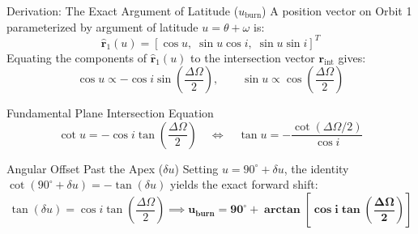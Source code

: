 \documentclass[aspectratio=169,10pt]{beamer}
\begin{document}
\begin{frame}{Derivation: The Exact Argument of Latitude (\texorpdfstring{$u_{\text{burn}}$}{u\_burn})}
    \footnotesize
    A position vector on Orbit 1 parameterized by argument of latitude $u = \theta + \omega$ is:
    $$\hat{\mathbf{r}}_1(u) = \left[ \cos u, \; \sin u \cos i, \; \sin u \sin i \right]^T$$
    Equating the components of $\hat{\mathbf{r}}_1(u)$ to the intersection vector $\mathbf{r}_{\text{int}}$ gives:
    $$\cos u \propto -\cos i \sin\left(\frac{\Delta\Omega}{2}\right), \qquad \sin u \propto \cos\left(\frac{\Delta\Omega}{2}\right)$$
    
    \vspace{-0.1cm}
    \begin{block}{Fundamental Plane Intersection Equation}
        \footnotesize
        $$\cot u = -\cos i \tan\left(\frac{\Delta\Omega}{2}\right) \quad \Longleftrightarrow \quad \tan u = -\frac{\cot(\Delta\Omega / 2)}{\cos i}$$
    \end{block}
    
    \vspace{-0.1cm}
    \begin{exampleblock}{Angular Offset Past the Apex ($\delta u$)}
        \footnotesize
        Setting $u = 90^\circ + \delta u$, the identity $\cot(90^\circ + \delta u) = -\tan(\delta u)$ yields the exact forward shift:
        $$\tan(\delta u) = \cos i \tan\left(\frac{\Delta\Omega}{2}\right) \implies \mathbf{u_{\text{burn}} = 90^\circ + \arctan\left[\cos i \tan\left(\frac{\Delta\Omega}{2}\right)\right]}$$
    \end{exampleblock}
\end{frame}
\end{document}
